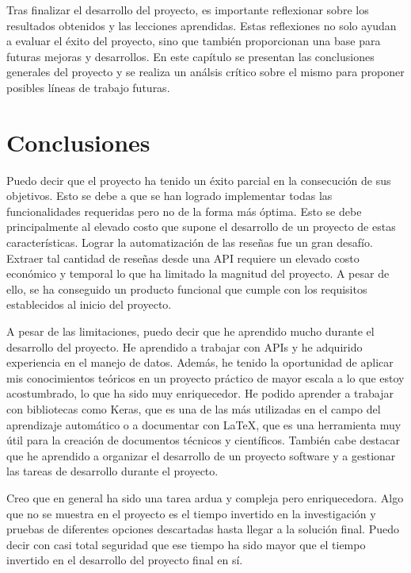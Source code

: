 
Tras finalizar el desarrollo del proyecto, es importante reflexionar sobre los resultados obtenidos y las lecciones aprendidas. Estas reflexiones no solo ayudan a evaluar el éxito del proyecto, sino que también proporcionan una base para futuras mejoras y desarrollos. 
En este capítulo se presentan las conclusiones generales del proyecto y se realiza un análsis crítico sobre el mismo para proponer posibles líneas de trabajo futuras.

\section{Conclusiones}

Puedo decir que el proyecto ha tenido un éxito parcial en la consecución de sus objetivos. Esto se debe a que se han logrado implementar todas las funcionalidades requeridas pero no de la forma más óptima. 
Esto se debe principalmente al elevado costo que supone el desarrollo de un proyecto de estas características. Lograr la automatización de las reseñas fue un gran desafío. Extraer tal cantidad de reseñas desde una API requiere un elevado costo económico y temporal lo que ha limitado la magnitud del proyecto.
A pesar de ello, se ha conseguido un producto funcional que cumple con los requisitos establecidos al inicio del proyecto.

A pesar de las limitaciones, puedo decir que he aprendido mucho durante el desarrollo del proyecto. He aprendido a trabajar con APIs y he adquirido experiencia en el manejo de datos. Además, he tenido la oportunidad de aplicar mis conocimientos teóricos en un proyecto práctico de mayor escala a lo que estoy acostumbrado, lo que ha sido muy enriquecedor.
He podido aprender a trabajar con bibliotecas como Keras, que es una de las más utilizadas en el campo del aprendizaje automático o a documentar con \LaTeX, que es una herramienta muy útil para la creación de documentos técnicos y científicos.
También cabe destacar que he aprendido a organizar el desarrollo de un proyecto software y a gestionar las tareas de desarrollo durante el proyecto.

Creo que en general ha sido una tarea ardua y compleja pero enriquecedora. Algo que no se muestra en el proyecto es el tiempo invertido en la investigación y pruebas de diferentes opciones descartadas hasta llegar a la solución final. Puedo decir con casi total seguridad que ese tiempo ha sido mayor que el tiempo invertido en el desarrollo del proyecto final en sí.


